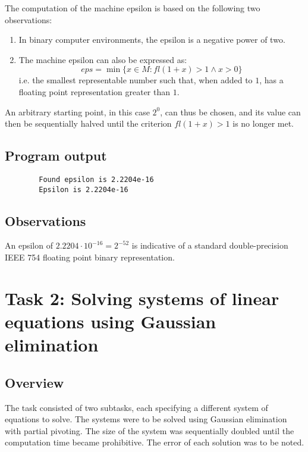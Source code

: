 \documentclass{article}
\begin{document}
	The computation of the machine epsilon is based on the following two
	observations:

	\begin{enumerate}
		\item In binary computer environments, the epsilon is a negative power
		of two.
		\item The machine epsilon can also be expressed as:
		\begin{equation}
			eps = \min\{x \in M: fl(1 + x) > 1 \land x > 0\}
		\end{equation}
		i.e. the smallest representable number such that, when added to $1$,
		has a floating point representation greater than $1$.
	\end{enumerate}

	An arbitrary starting point, in this case $2^0$, can thus be chosen, and its
	value can then be sequentially halved until the criterion $fl(1 + x) > 1$ is
	no longer met.

	\subsection{Program output}

	\begin{verbatim}
		Found epsilon is 2.2204e-16
		Epsilon is 2.2204e-16
	\end{verbatim}

	\subsection{Observations}

	An epsilon of $2.2204 \cdot 10^{-16} = 2^{-52}$ is indicative of a standard
	double-precision IEEE 754 floating point binary representation.

	\newpage

	\section{Task 2: Solving systems of linear equations using Gaussian
	elimination}

	\subsection{Overview}

	The task consisted of two subtasks, each specifying a different system
	of equations to solve. The systems were to be solved using Gaussian
	elimination with partial pivoting. The size of the system was sequentially
	doubled until the computation time became prohibitive. The error of each
	solution was to be noted.
\end{document}
